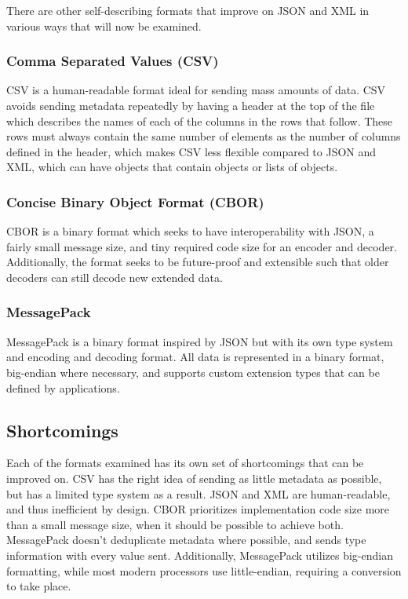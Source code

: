 \documentclass[conference]{IEEEtran}
\begin{document}
There are other self-describing formats that improve on JSON and XML in various ways that will now be examined.

\subsubsection{Comma Separated Values (CSV)}

CSV\cite{csv_spec} is a human-readable format ideal for sending mass amounts of data. CSV avoids sending metadata repeatedly by having a header at the top of the file which describes the names of each of the columns in the rows that follow. These rows must always contain the same number of elements as the number of columns defined in the header, which makes CSV less flexible compared to JSON and XML, which can have objects that contain objects or lists of objects.

\subsubsection{Concise Binary Object Format (CBOR)}

CBOR\cite{cbor_spec} is a binary format which seeks to have interoperability with JSON, a fairly small message size, and tiny required code size for an encoder and decoder. Additionally, the format seeks to be future-proof and extensible such that older decoders can still decode new extended data.

\subsubsection{MessagePack}

MessagePack\cite{msgpack_spec} is a binary format inspired by JSON but with its own type system and encoding and decoding format. All data is represented in a binary format, big-endian where necessary, and supports custom extension types that can be defined by applications.

\subsection{Shortcomings}

Each of the formats examined has its own set of shortcomings that can be improved on. CSV has the right idea of sending as little metadata as possible, but has a limited type system as a result. JSON and XML are human-readable, and thus inefficient by design. CBOR prioritizes implementation code size more than a small message size, when it should be possible to achieve both. MessagePack doesn't deduplicate metadata where possible, and sends type information with every value sent. Additionally, MessagePack utilizes big-endian formatting, while most modern processors use little-endian, requiring a conversion to take place.
\end{document}

